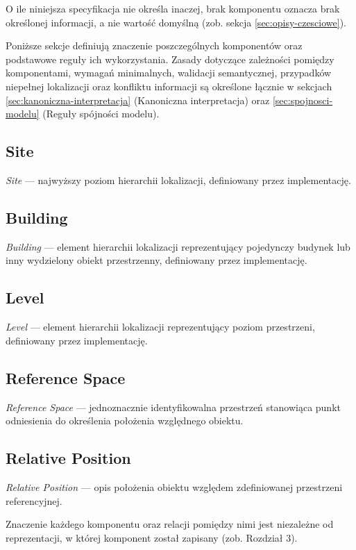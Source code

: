 O ile niniejsza specyfikacja nie określa inaczej, brak komponentu oznacza brak określonej informacji, a nie wartość domyślną (zob. sekcja \ref{sec:opisy-czesciowe}).

Poniższe sekcje definiują znaczenie poszczególnych komponentów oraz podstawowe reguły ich wykorzystania. Zasady dotyczące zależności pomiędzy komponentami, wymagań minimalnych, walidacji semantycznej, przypadków niepełnej lokalizacji oraz konfliktu informacji są określone łącznie w sekcjach \ref{sec:kanoniczna-interpretacja} (Kanoniczna interpretacja) oraz \ref{sec:spojnosci-modelu} (Reguły spójności modelu).

\subsection{Site}
\label{sec:comp-site}
\textit{Site} --- najwyższy poziom hierarchii lokalizacji, definiowany przez implementację.

\subsection{Building}
\label{sec:comp-building}
\textit{Building} --- element hierarchii lokalizacji reprezentujący pojedynczy budynek lub inny wydzielony obiekt przestrzenny, definiowany przez implementację.

\subsection{Level}
\label{sec:comp-level}
\textit{Level} --- element hierarchii lokalizacji reprezentujący poziom przestrzeni, definiowany przez implementację.

\subsection{Reference Space}
\label{sec:comp-refspace}
\textit{Reference Space} --- jednoznacznie identyfikowalna przestrzeń stanowiąca punkt odniesienia do określenia położenia względnego obiektu.

\subsection{Relative Position}
\label{sec:comp-relpos}
\textit{Relative Position} --- opis położenia obiektu względem zdefiniowanej przestrzeni referencyjnej.

Znaczenie każdego komponentu oraz relacji pomiędzy nimi jest niezależne od reprezentacji, w której komponent został zapisany (zob. Rozdział 3).

